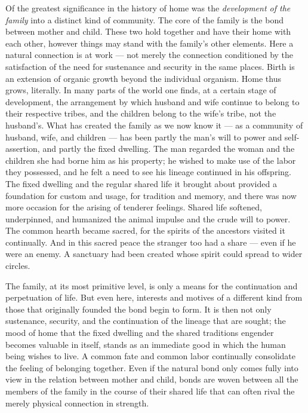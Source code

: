 \documentclass[12pt,a4paper]{article}
\newcommand{\opage}[1]{\marginnote{\footnotesize\textit{[#1]}}}
\begin{document}
Of the greatest significance in the history of home was the \emph{development of the family} into a distinct kind of community. The core of the family
is the bond between mother and child. These two hold together and
have their home with each other, however things may stand with the
family's other elements. Here a natural connection is at work --- not
merely the connection conditioned by the satisfaction of the need for
sustenance and security in the same places. Birth is an extension of
organic growth beyond the individual organism. Home thus grows,
literally. In many parts of the world one finds, at a certain stage of
development, the arrangement by which husband and wife continue to
belong to their respective tribes, and the children belong to the
wife's tribe, not the husband's. What has created the family as we now
know it --- as a community of husband, wife, and children --- has been
partly the man's will to power and self-assertion, and partly the fixed
dwelling. The man regarded the woman and the children she had borne
him as his property; he wished to make use of the labor they possessed,
and he felt a need to see his lineage continued in his offspring. The
fixed dwelling and the regular shared life it brought about provided a
foundation for custom and usage, for tradition and memory, and there
was now more occasion for the arising of tenderer feelings. Shared life
softened, underpinned, and humanized the animal impulse and the crude
will to power. The common hearth became sacred, for the spirits of the
ancestors visited it continually. And in this sacred peace the stranger too had a share --- even if he were an enemy.
A sanctuary had been created whose spirit could spread to wider circles.

The family, at its most primitive level, is only a means for the
continuation and perpetuation of life. But even here, interests and
motives of a different kind from those that originally founded the
bond begin to form. It is then not only sustenance, security, and the
continuation of the lineage that are sought; the mood of home that the
fixed dwelling and the shared traditions engender becomes valuable in
itself, stands as an immediate good in which the human being wishes
to live. A common fate and common labor continually consolidate the
feeling of belonging together. Even if the natural bond only comes
fully into view in the relation between mother and child, bonds are
woven between \opage{6}all the members of the family in the course of their
shared life that can often rival the merely physical connection in
strength.
\end{document}
